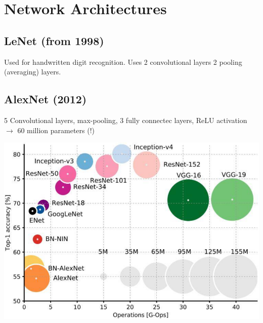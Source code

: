 \section{Network Architectures}
\begin{minipage}{0.5\textwidth}
    \subsection{LeNet (from 1998)}
    Used for handwritten digit recognition. Uses 2 convolutional layers 2 pooling (averaging) layers.

    \subsection{AlexNet (2012)}
    5 Convolutional layers, max-pooling, 3 fully connectec layers, ReLU activation $\rightarrow$ 60 million parameters (!)
\end{minipage}
\begin{minipage}{0.5\textwidth}
    \includegraphics[width=\textwidth]{sections/NetworkArchitectures/img/accuracy_on_imagenet.png}
\end{minipage}



